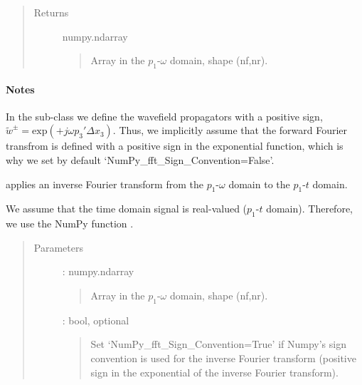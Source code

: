 \documentclass[letterpaper,10pt,english]{sphinxmanual}
\begin{document}
\begin{fulllineitems}
\begin{fulllineitems}
\begin{quote}
\begin{description}
\item[{Returns}] \leavevmode
numpy.ndarray
\begin{quote}

Array in the \(p_1\)-\(\omega\) domain, shape (nf,nr).
\end{quote}

\end{description}\end{quote}
\paragraph{Notes}

In the sub-class  we define the wavefield propagators with a positive sign, \(\tilde{w}^{\pm} = \mathrm{exp}(+j \omega p_3' \Delta x_3)\). Thus, we implicitly assume that the forward Fourier transfrom is defined with a positive sign in the exponential function, which is why we set by default ‘NumPy\_fft\_Sign\_Convention=False’.

\end{fulllineitems}


\begin{fulllineitems}
\label{\detokenize{Wavefield_NRM_p_w:Wavefield_NRM_p_w.Wavefield_NRM_p_w.PW2PT}}
applies an inverse Fourier transform from the \(p_1\)-\(\omega\) domain to  the \(p_1\)-\(t\) domain.

We assume that the time domain signal is real-valued (\(p_1\)-\(t\) domain). Therefore, we use the NumPy function .
\begin{quote}\begin{description}
\item[{Parameters}] \leavevmode
{} : numpy.ndarray
\begin{quote}

Array in the \(p_1\)-\(\omega\) domain, shape (nf,nr).
\end{quote}

 : bool, optional
\begin{quote}

Set ‘NumPy\_fft\_Sign\_Convention=True’ if Numpy’s sign convention is used for the inverse Fourier transform (positive sign in the exponential of the inverse Fourier transform).
\end{quote}


\end{description}
\end{quote}
\end{fulllineitems}
\end{fulllineitems}
\end{document}
